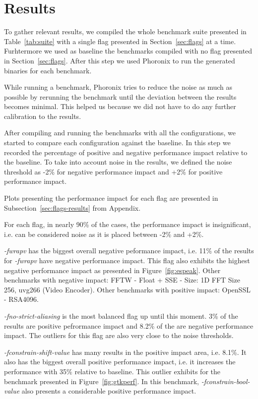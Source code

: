 \section{Results} \label{sec:results}


To gather relevant results, we compiled the whole benchmark suite presented in
Table~\ref{tab:suite} with a single flag presented in Section~\ref{sec:flags} at
a time. Furhtermore we used as baseline the benchmarks compiled with no flag
presented in Section~\ref{sec:flags}. After this step we used Phoronix to run
the generated binaries for each benchmark.

While running a benchmark, Phoronix tries to reduce the noise as much as
possible by rerunning the benchmark until the deviation between the results
becomes minimal. This helped us because we did not have to do any further
calibration to the results.

After compiling and running the benchmarks with all the configurations, we
started to compare each configuration against the baseline. In this step we
recorded the percentage of positive and negative performance impact relative to
the baseline. To take into account noise in the results, we defined the noise
threshold as -2\% for negative performance impact and +2\% for positive
performance impact.

Plots presenting the performance impact for each flag are presented in
Subsection~\ref{sec:flags-results} from Appendix.

For each flag, in nearly 90\% of the cases, the performance impact is
insignificant, i.e. can be considered noise as it is placed between -2\% and
+2\%. 

\textit{-fwrapv} has the biggest overall negative peformance impact, i.e. 11\%
of the results for \textit{-fwrapv} have negative performance impact. This flag
also exhibits the highest negative performance impact as presented in
Figure~\ref{fig:espeak}. Other benchmarks with negative impact: FFTW - Float +
SSE - Size: 1D FFT Size 256, uvg266 (Video Encoder). Other benchmarks with
positive impact: OpenSSL - RSA4096.

\textit{-fno-strict-aliasing} is the most balanced flag up until this moment.
3\% of the results are positive pefrormance impact and 8.2\% of the are negative
performance impact. The outliers for this flag are also very close to the noise
thresholds.

\textit{-fconstrain-shift-value} has many results in the positive impact area,
i.e. 8.1\%. It also has the biggest overall positive performance impact, i.e.
it increases the performance with 35\% relative to baseline. This outlier
exhibits for the benchmark presented in Figure~\ref{fig:gtkperf}. In this
benchmark, \textit{-fconstrain-bool-value} also presents a considerable positive
performance impact.

